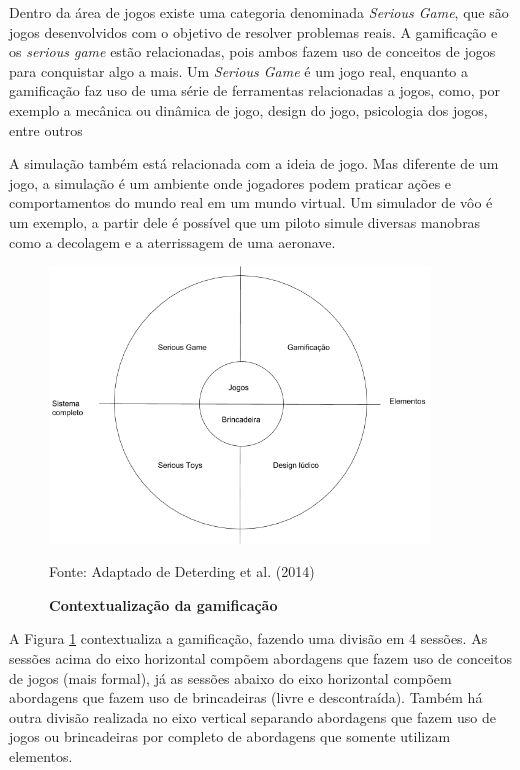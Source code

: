 \documentclass[
	12pt,				%
	oneside,			%
	a4paper,			%
	english,			%
	french,				%
	spanish,			%
	brazil,				%
	]{abntex2}
\begin{document}
Dentro da área de jogos existe uma categoria denominada \textit{Serious Game}, que são jogos desenvolvidos com o objetivo de resolver problemas reais. A gamificação e os \textit{serious game} estão relacionadas, pois ambos fazem uso de conceitos de jogos para conquistar algo a mais. Um \textit{Serious Game} é um jogo real, enquanto a gamificação faz uso de uma série de ferramentas relacionadas a jogos, como, por exemplo a mecânica ou dinâmica de jogo, design do jogo, psicologia dos jogos, entre outros \cite{dorling2012software}

A simulação também está relacionada com a ideia de jogo. Mas diferente de um jogo, a simulação é um ambiente onde jogadores podem praticar ações e comportamentos do mundo real em um mundo virtual. Um simulador de vôo é um exemplo, a partir dele é possível que um piloto simule diversas manobras como a decolagem e a aterrissagem de uma aeronave.

\begin{figure}[ht]
\centering
\caption{\textbf{Contextualização da gamificação }}
\includegraphics[width=0.9\textwidth]{imagens/gamificacao.png}

Fonte: Adaptado de Deterding et al. (2014)
\label{fig:gamificacao}
\end{figure}

A Figura \ref{fig:gamificacao} contextualiza a gamificação, fazendo uma divisão em 4 sessões. As sessões acima do eixo horizontal compõem abordagens que fazem uso de conceitos de jogos (mais formal), já as sessões abaixo do eixo horizontal compõem abordagens que fazem uso de brincadeiras (livre e descontraída). Também há outra divisão realizada no eixo vertical separando abordagens que fazem uso de jogos ou brincadeiras por completo de abordagens que somente utilizam elementos.
\end{document}
